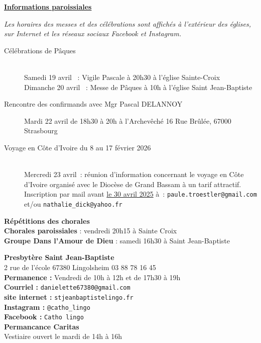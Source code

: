 \documentclass[11pt,a4paper]{article}
\newcommand{\NewsItem}[1]{%
\vspace{3pt}
\underline{\textbf{#1}}
		  }
\begin{document}
\NewsItem{Informations paroissiales}

\textit{Les horaires des messes et des célébrations sont affichés à l’extérieur des églises, sur Internet et les réseaux sociaux Facebook et Instagram.}



\begin{framed}
\begin{description}
\item[Célébrations de Pâques]
~\\
Samedi 19 avril              : Vigile Pascale à 20h30 à l’église Sainte-Croix\\
Dimanche 20 avril         : Messe de Pâques à 10h à l’église Saint Jean-Baptiste
\item[Rencontre des confirmands avec Mgr Pascal DELANNOY]
Mardi 22 avril de 18h30 à 20h à l’Archevêché 16 Rue Brûlée, 67000 Strasbourg
\item[Voyage en Côte d’Ivoire du 8 au 17 février 2026]
~\\
Mercredi 23 avril : réunion d’information concernant le voyage en Côte d’Ivoire
organisé avec le Diocèse de Grand Bassam à un tarif attractif.
Inscription par mail avant \underline{le 30 avril 2025} à : \texttt{paule.troestler@gmail.com} et/ou   \texttt{nathalie\_dick@yahoo.fr}
\end{description}
\end{framed}


\textbf{Répétitions des chorales}\\
\textbf{Chorales paroissiales} : vendredi 20h15 à Sainte Croix\\
\textbf{Groupe \og Dans l’Amour de Dieu \fg} : samedi 16h30 à Saint Jean-Baptiste

\begin{multicols}{2}
\textbf{Presbytère Saint Jean-Baptiste}\\
2 rue de l'école 67380 Lingolsheim 03 88 78 16 45\\
\textbf{Permanence :} Vendredi de 10h à 12h et de 17h30 à 19h\\
\textbf{Courriel :} \texttt{danielette67380@gmail.com}\\
\textbf{site internet :} \texttt{stjeanbaptistelingo.fr}\\
\textbf{Instagram :} \texttt{@catho\_lingo}\\
\textbf{Facebook :} \texttt{Catho lingo}\\
\textbf{Permancance Caritas}\\ Vestiaire ouvert le mardi de 14h à 16h\\
\end{multicols}
\end{document}
